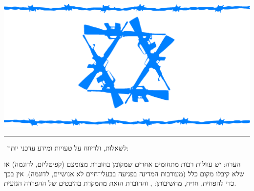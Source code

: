 \vfill


\begin{center}
	\includegraphics[width=0.6\linewidth]{flago.eps}
\end{center}

\vfill

\hrule

~\hfill לשאלות, ולדיווח על טעויות ומידע עדכני יותר: \hfill~

\small הערה: יש עוולות רבות מתחומים אחרים שמקומן בחוברת מצומצם (קפיטליזם, לדוגמה) או שלא קיבלו מקום כלל (מעורבות המדינה בפגיעה בבעלי־חיים לא אנושיים, לדוגמה). אין בכך כדי להפחית, חו״ח, מחשיבותן: , והחוברת הזאת מתמקדת בהיבטים של ההפרדה הגזעית.
